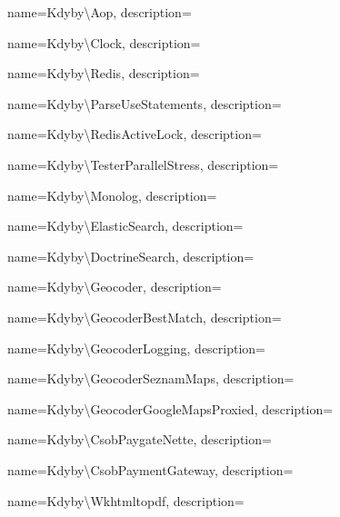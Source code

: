  {
  name={K\-dy\-by\textbackslash{}\-Aop},
  description={} }

 {
  name={K\-dy\-by\textbackslash{}\-Clo\-ck},
  description={} }

 {
  name={K\-dy\-by\textbackslash{}\-Re\-di\-s},
  description={} }

 {
  name={K\-dy\-by\textbackslash{}\-Par\-se\-Use\-Sta\-te\-men\-ts},
  description={} }

 {
  name={K\-dy\-by\textbackslash{}\-Re\-dis\-Acti\-ve\-Lock},
  description={} }

 {
  name={K\-dy\-by\textbackslash{}\-Tes\-ter\-Pa\-ra\-ll\-el\-St\-ress},
  description={} }

 {
  name={K\-dy\-by\textbackslash{}\-Mo\-no\-log},
  description={} }

 {
  name={K\-dy\-by\textbackslash{}\-Elastic\-Sear\-ch},
  description={} }

 {
  name={K\-dy\-by\textbackslash{}\-Doc\-tri\-ne\-Sear\-ch},
  description={} }

 {
  name={K\-dy\-by\textbackslash{}\-Geo\-co\-der},
  description={} }

 {
  name={K\-dy\-by\textbackslash{}\-Geo\-co\-der\-Be\-st\-Ma\-tch},
  description={} }

 {
  name={K\-dy\-by\textbackslash{}\-Geo\-co\-der\-Log\-g\-ing},
  description={} }

 {
  name={K\-dy\-by\textbackslash{}\-Geo\-co\-der\-Se\-z\-nam\-Ma\-ps},
  description={} }

 {
  name={K\-dy\-by\textbackslash{}\-Geo\-co\-der\-Goo\-gle\-Ma\-ps\-Pro\-xi\-ed},
  description={} }

 {
  name={K\-dy\-by\textbackslash{}\-C\-s\-o\-b\-Pay\-ga\-te\-Ne\-tte},
  description={} }

 {
  name={K\-dy\-by\textbackslash{}\-C\-s\-o\-b\-Pay\-me\-nt\-Ga\-te\-way},
  description={} }

 {
  name={K\-dy\-by\textbackslash{}\-Wk\-html\-to\-pdf},
  description={} }

